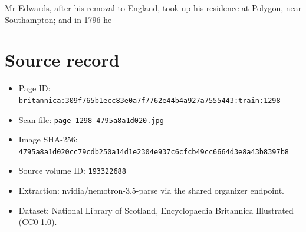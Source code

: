 \documentclass{article}
\begin{document}
Mr Edwards, after his removal to England, took up his residence at Polygon, near Southampton; and in 1796 he

\section*{Source record}
\begin{itemize}
\item Page ID: \texttt{britannica:309f765b1ecc83e0a7f7762e44b4a927a7555443:train:1298}
\item Scan file: \texttt{page-1298-4795a8a1d020.jpg}
\item Image SHA-256: \texttt{4795a8a1d020cc79cdb250a14d1e2304e937c6cfcb49cc6664d3e8a43b8397b8}
\item Source volume ID: \texttt{193322688}
\item Extraction: nvidia/nemotron-3.5-parse via the shared organizer endpoint.
\item Dataset: National Library of Scotland, Encyclopaedia Britannica Illustrated (CC0 1.0).
\end{itemize}
\end{document}
